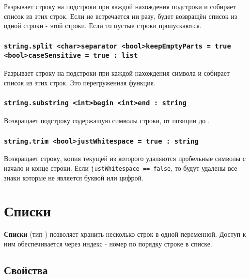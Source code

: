 \documentclass[a4paper, 14pt]{extarticle}
\begin{document}
Разрывает строку на подстроки при каждой нахождения подстроки  и собирает список из этих строк. Если  не встречается ни разу, будет возвращён список из одной строки - этой строки. Если  то пустые строки пропускаются.

\subsubsection{\lstinline|string.split <char>separator <bool>keepEmptyParts = true <bool>caseSensitive = true : list|}

Разрывает строку на подстроки при каждой нахождения символа  и собирает список из этих строк. Это перегруженная функция.

\subsubsection{\lstinline|string.substring <int>begin <int>end : string|}

Возвращает подстроку содержащую символы строки, от позиции  до .

\subsubsection{\lstinline|string.trim <bool>justWhitespace = true : string|}

Возвращает строку, копия текущей из которого удаляются пробельные символы с начало и конце строки. Если \lstinline|justWhitespace == false|, то будут удалены все знаки которые не является буквой или цифрой.


\newpage
\section{Списки}

{\bf Списки} (тип ) позволяет хранить несколько строк в одной переменной. Доступ к ним обеспечивается через индекс - номер по порядку строке в списке.

\subsection{Свойства}
\end{document}

